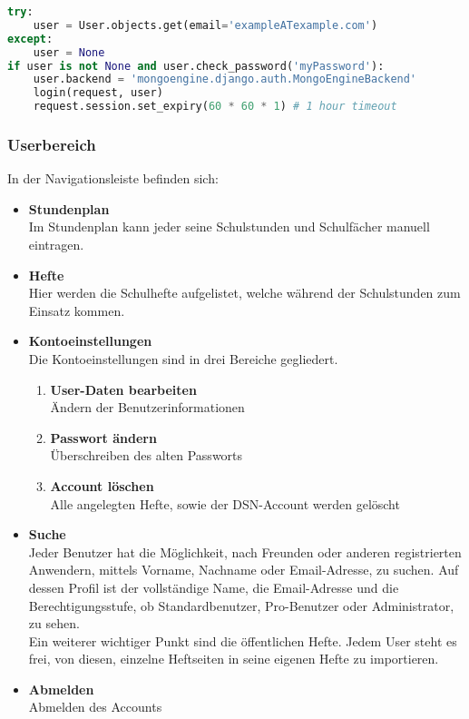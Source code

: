 \begin{lstlisting}[caption={Session Timeout}, language=Python]
try:
    user = User.objects.get(email='exampleATexample.com')
except:
    user = None
if user is not None and user.check_password('myPassword'):
    user.backend = 'mongoengine.django.auth.MongoEngineBackend'
    login(request, user)
    request.session.set_expiry(60 * 60 * 1) # 1 hour timeout
\end{lstlisting}

\newpage

\subsubsection{Userbereich}


In der Navigationsleiste befinden sich:
\begin{itemize}
\item \textbf{Stundenplan}\\ Im Stundenplan kann jeder seine Schulstunden und Schulfächer manuell eintragen.
\item \textbf{Hefte}\\ Hier werden die Schulhefte aufgelistet, welche während der Schulstunden zum Einsatz kommen.
\item \textbf{Kontoeinstellungen}\\ Die Kontoeinstellungen sind in drei Bereiche gegliedert.
\begin{enumerate}
\item \textbf{User-Daten bearbeiten}\\ Ändern der Benutzerinformationen
\item \textbf{Passwort ändern}\\ Überschreiben des alten Passworts
\item \textbf{Account löschen}\\ Alle angelegten Hefte, sowie der DSN-Account werden gelöscht
\end{enumerate}
\item \textbf{Suche}\\ Jeder Benutzer hat die Möglichkeit, nach Freunden oder anderen registrierten Anwendern, mittels Vorname, Nachname oder Email-Adresse, zu suchen. Auf dessen Profil ist der vollständige Name, die Email-Adresse und die Berechtigungsstufe, ob Standardbenutzer, Pro-Benutzer oder Administrator, zu sehen.\\
Ein weiterer wichtiger Punkt sind die öffentlichen Hefte. Jedem User steht es frei, von diesen, einzelne Heftseiten in seine eigenen Hefte zu importieren.
\item \textbf{Abmelden}\\ Abmelden des Accounts
\end{itemize}
\newpage 

